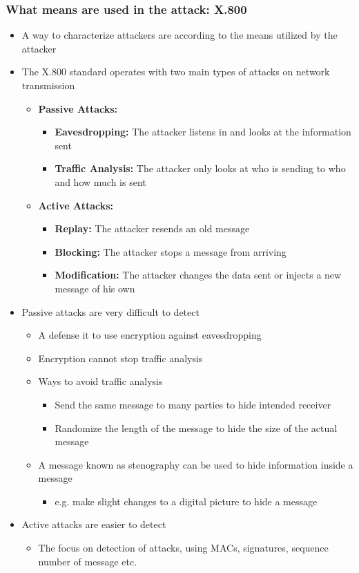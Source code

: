 \documentclass[11pt]{article}
\begin{document}
\subsubsection{What means are used in the attack: X.800}
\label{sec:org8559695}
\begin{itemize}
\item A way to characterize attackers are according to the means utilized by the attacker
\item The X.800 standard operates with two main types of attacks on network transmission
\begin{itemize}
\item \textbf{Passive Attacks:}
\begin{itemize}
\item \textbf{Eavesdropping:} The attacker listens in and looks at the information sent
\item \textbf{Traffic Analysis:} The attacker only looks at who is sending to who and how much is sent
\end{itemize}
\item \textbf{Active Attacks:}
\begin{itemize}
\item \textbf{Replay:} The attacker resends an old message
\item \textbf{Blocking:} The attacker stops a message from arriving
\item \textbf{Modification:} The attacker changes the data sent or injects a new message of his own
\end{itemize}
\end{itemize}

\item Passive attacks are very difficult to detect
\begin{itemize}
\item A defense it to use encryption against eavesdropping
\item Encryption cannot stop traffic analysis
\item Ways to avoid traffic analysis
\begin{itemize}
\item Send the same message to many parties to hide intended receiver
\item Randomize the length of the message to hide the size of the actual message
\end{itemize}
\item A message known as stenography can be used to hide information inside a message
\begin{itemize}
\item e.g. make slight changes to a digital picture to hide a message
\end{itemize}
\end{itemize}

\item Active attacks are easier to detect
\begin{itemize}
\item The focus on detection of attacks, using MACs, signatures, sequence number of message etc.
\end{itemize}
\end{itemize}
\end{document}
